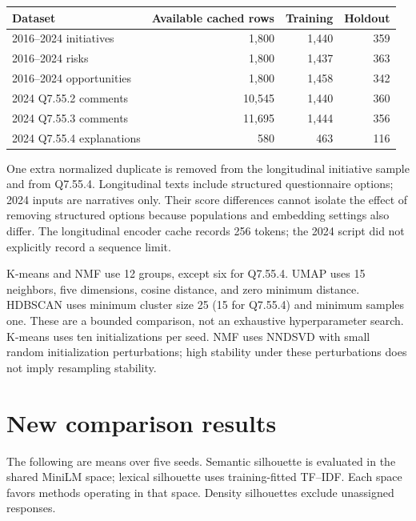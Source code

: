 \documentclass[11pt,a4paper]{article}
\begin{document}
\begin{center}
\small
\begin{tabular}{lrrr}
\toprule
Dataset & Available cached rows & Training & Holdout \\
\midrule
2016--2024 initiatives & 1,800 & 1,440 & 359 \\
2016--2024 risks & 1,800 & 1,437 & 363 \\
2016--2024 opportunities & 1,800 & 1,458 & 342 \\
2024 Q7.55.2 comments & 10,545 & 1,440 & 360 \\
2024 Q7.55.3 comments & 11,695 & 1,444 & 356 \\
2024 Q7.55.4 explanations & 580 & 463 & 116 \\
\bottomrule
\end{tabular}
\end{center}
One extra normalized duplicate is removed from the longitudinal initiative
sample and from Q7.55.4. Longitudinal texts include structured questionnaire
options; 2024 inputs are narratives only. Their score differences cannot
isolate the effect of removing structured options because populations and
embedding settings also differ. The longitudinal encoder cache records
256 tokens; the 2024 script did not explicitly record a sequence limit.

K-means and NMF use 12 groups, except six for Q7.55.4.
UMAP uses 15 neighbors, five dimensions, cosine distance, and zero
minimum distance. HDBSCAN uses minimum cluster size 25 (15 for Q7.55.4)
and minimum samples one. These are a bounded comparison, not an exhaustive
hyperparameter search. K-means uses ten initializations per seed.
NMF uses NNDSVD with small random initialization perturbations; high
stability under these perturbations does not imply resampling stability.

\section{New comparison results}
The following are means over five seeds. Semantic silhouette is evaluated
in the shared MiniLM space; lexical silhouette uses training-fitted
TF--IDF. Each space favors methods operating in that space.
Density silhouettes exclude unassigned responses.
\end{document}
